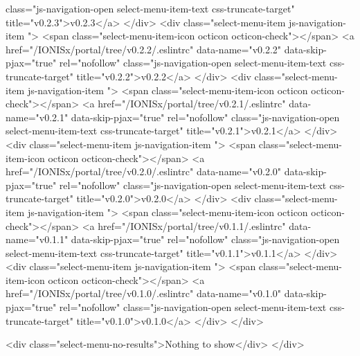                  class="js-navigation-open select-menu-item-text css-truncate-target"
                 title="v0.2.3">v0.2.3</a>
            </div>
            <div class="select-menu-item js-navigation-item ">
              <span class="select-menu-item-icon octicon octicon-check"></span>
              <a href="/IONISx/portal/tree/v0.2.2/.eslintrc"
                 data-name="v0.2.2"
                 data-skip-pjax="true"
                 rel="nofollow"
                 class="js-navigation-open select-menu-item-text css-truncate-target"
                 title="v0.2.2">v0.2.2</a>
            </div>
            <div class="select-menu-item js-navigation-item ">
              <span class="select-menu-item-icon octicon octicon-check"></span>
              <a href="/IONISx/portal/tree/v0.2.1/.eslintrc"
                 data-name="v0.2.1"
                 data-skip-pjax="true"
                 rel="nofollow"
                 class="js-navigation-open select-menu-item-text css-truncate-target"
                 title="v0.2.1">v0.2.1</a>
            </div>
            <div class="select-menu-item js-navigation-item ">
              <span class="select-menu-item-icon octicon octicon-check"></span>
              <a href="/IONISx/portal/tree/v0.2.0/.eslintrc"
                 data-name="v0.2.0"
                 data-skip-pjax="true"
                 rel="nofollow"
                 class="js-navigation-open select-menu-item-text css-truncate-target"
                 title="v0.2.0">v0.2.0</a>
            </div>
            <div class="select-menu-item js-navigation-item ">
              <span class="select-menu-item-icon octicon octicon-check"></span>
              <a href="/IONISx/portal/tree/v0.1.1/.eslintrc"
                 data-name="v0.1.1"
                 data-skip-pjax="true"
                 rel="nofollow"
                 class="js-navigation-open select-menu-item-text css-truncate-target"
                 title="v0.1.1">v0.1.1</a>
            </div>
            <div class="select-menu-item js-navigation-item ">
              <span class="select-menu-item-icon octicon octicon-check"></span>
              <a href="/IONISx/portal/tree/v0.1.0/.eslintrc"
                 data-name="v0.1.0"
                 data-skip-pjax="true"
                 rel="nofollow"
                 class="js-navigation-open select-menu-item-text css-truncate-target"
                 title="v0.1.0">v0.1.0</a>
            </div>
        </div>

        <div class="select-menu-no-results">Nothing to show</div>
      </div>


